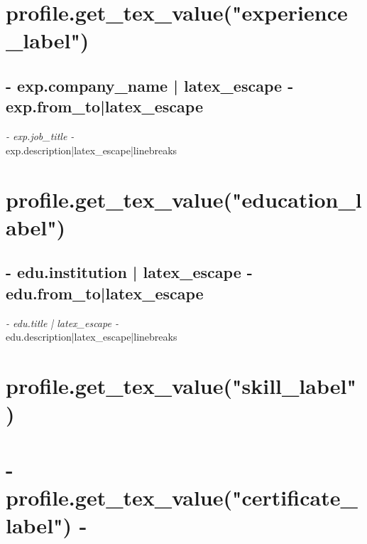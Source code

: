 \documentclass[a4paper, {{- app.cv.latex_pt -}}pt]{report}
\begin{document}
{{{{{%
\section*{ {{ profile.get_tex_value("experience_label") }} }
{%
\subsection*{ {{- exp.company_name | latex_escape -}} \hfill {{ exp.from_to|latex_escape }}  }
\textit{ {{- exp.job_title -}} } \vspace{3mm} \\
{{ exp.description|latex_escape|linebreaks }}
{%
{%

{%
\section*{ {{ profile.get_tex_value("education_label") }}}
{%
\subsection*{ {{- edu.institution | latex_escape -}} \hfill {{ edu.from_to|latex_escape }} }
\textit{ {{- edu.title | latex_escape -}} } \vspace{3mm} \\
{{ edu.description|latex_escape|linebreaks }}
{%
{%

{%
\section*{ {{ profile.get_tex_value("skill_label") }}}
\begin{center}
\end{center}
{%

{%
\section*{ {{- profile.get_tex_value("certificate_label") -}} }
{%

}}}}}}}}}}}}}}}}
\end{document}
